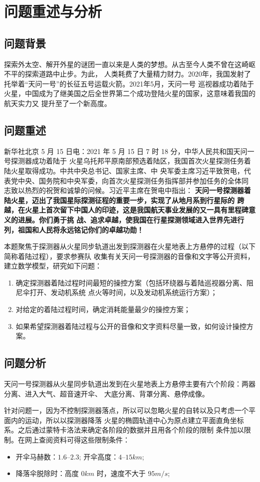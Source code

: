 \documentclass[hyperref,a4paper,UTF8]{ctexart}
\begin{document}
\section{问题重述与分析}
\subsection{问题背景}
探索外太空、解开外星的谜团一直以来是人类的梦想。从古至今人类不曾在这崎岖不平的探索道路中止步。为此，
人类耗费了大量精力财力。2020年，我国发射了托举着“天问一号”的长征五号运载火箭。2021年5月，天问一号
巡视器成功着陆于火星，中国成为了继美国之后全世界第二个成功登陆火星的国家，这意味着我国的航天实力又
提升至了一个新高度。
\subsection{问题重述}
新华社北京 5 月 15 日电：2021 年 5 月 15 日 7 时 18 分，中华人民共和国天问一号探测器成功着陆于
火星乌托邦平原南部预选着陆区，我国首次火星探测任务着陆火星取得成功。中共中央总书记、国家主席、中
央军委主席习近平致贺电，代表党中央、国务院和中央军委，向首次火星探测任务指挥部并参加任务的全体同
志致以热烈的祝贺和诚挚的问候。习近平主席在贺电中指出：%
\textbf{天问一号探测器着陆火星，迈出了我国星际探测征程的重要一步，实现了从地月系到行星际的
    跨越，在火星上首次留下中国人的印迹，这是我国航天事业发展的又一具有里程碑意义的进展。你们勇于挑
    战、追求卓越，使我国在行星探测领域进入世界先进行列，祖国和人民将永远铭记你们的卓越功勋！}

本题聚焦于探测器从火星同步轨道出发到探测器在火星地表上方悬停的过程（以下简称着陆过程），要求参赛队
收集有关天问一号探测器的音像和文字等公开资料，建立数学模型，研究如下问题：
\begin{enumerate}
    \item 确定探测器着陆过程时间最短的操控方案（包括环绕器与着陆巡视器分离、阻尼伞打开、发动机系统
          点火等时间，以及发动机系统运行方案）；
    \item 对给定的着陆过程时间，确定消耗能量最少的操控方案；
    \item 如果希望探测器着陆过程与公开的音像和文字资料尽量一致，如何设计操控方案。
\end{enumerate}
\subsection{问题分析}
天问一号探测器从火星同步轨道出发到在火星地表上方悬停主要有六个阶段：两器分离、进入大气、超音速开伞、
大底分离、背罩分离、悬停成像。

针对问题一，因为不控制探测器落点，所以可以忽略火星的自转以及只考虑一个平面内的运动，所以以探测器降落
火星的椭圆轨道中心为原点建立平面直角坐标系。之后通过蒙特卡洛法来确定各阶段的数据并且用各个阶段的限制
条件加以限制。在网上查阅资料可得这些限制条件：
\begin{itemize}
    \item 开伞马赫数：$1.6$--$2.3$; 开伞高度：$4$--$15km$;
    \item 降落伞脱除时：高度 $0km$ 时，速度不大于 $95m/s$;
\end{itemize}
\end{document}
